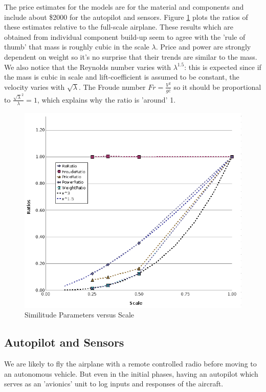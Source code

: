 \documentclass[titlepage,10pt]{article}
\begin{document}
The price estimates for the models are for the material and components and include about \$2000 for the autopilot and sensors. Figure \ref{fig:scales} plots the ratios of these estimates relative to the full-scale airplane. These results which are obtained from individual component build-up seem to agree with the 'rule of thumb' that mass is roughly cubic in the scale $\lambda$. Price and power are strongly dependent on weight so it's no surprise that their trends are similar to the mass. We also notice that the Reynolds number varies with $\lambda^{1.5}$: this is expected since if the mass is cubic in scale and lift-coefficient is assumed to be constant, the velocity varies with $\sqrt{\lambda}$. The Froude number $Fr =\frac{V^2}{g \bar{c}}$ so it should be proportional to $\frac{{\sqrt{\lambda}}^2}{\lambda}=1$, which explains why the ratio is 'around' 1.

\begin{figure}[h]
\begin{center}
\includegraphics[width=140mm]{scale-graph.png}
\end{center}
\caption{Similitude Parameters versus Scale}
\label{fig:scales}
\end{figure}

\clearpage


\subsection{Autopilot and Sensors}
We are likely to fly the airplane with a remote controlled radio before moving to an autonomous vehicle. But even in the initial phases, having an autopilot which serves as an 'avionics' unit to log inputs and responses of the aircraft.\\
\end{document}
